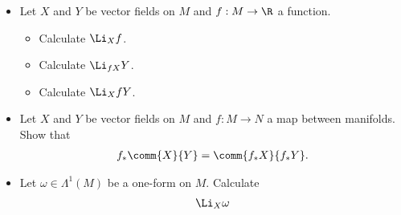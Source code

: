 \begin{Ebox}
  \begin{itemize}
  \item Let $X$ and $Y$ be vector fields on $M$ and $f:M\to\R$ a function.
    \begin{itemize}
    \item Calculate $\Li_{X}f$.
    \item Calculate $\Li_{fX}Y$.
    \item Calculate $\Li_{X}fY$.
    \end{itemize}
  \item  Let $X$ and $Y$ be vector fields on $M$ and $f:M\to N$ a map between manifolds. Show that
    \begin{align}
      f_*\comm{X}{Y} =\comm{f_*X}{f_*Y}.
    \end{align}
  \item Let $\omega\in\Lambda^1(M)$ be a one-form on $M$. Calculate
    \begin{align}
      \Li_X \omega
    \end{align}
  \end{itemize}
\end{Ebox}
